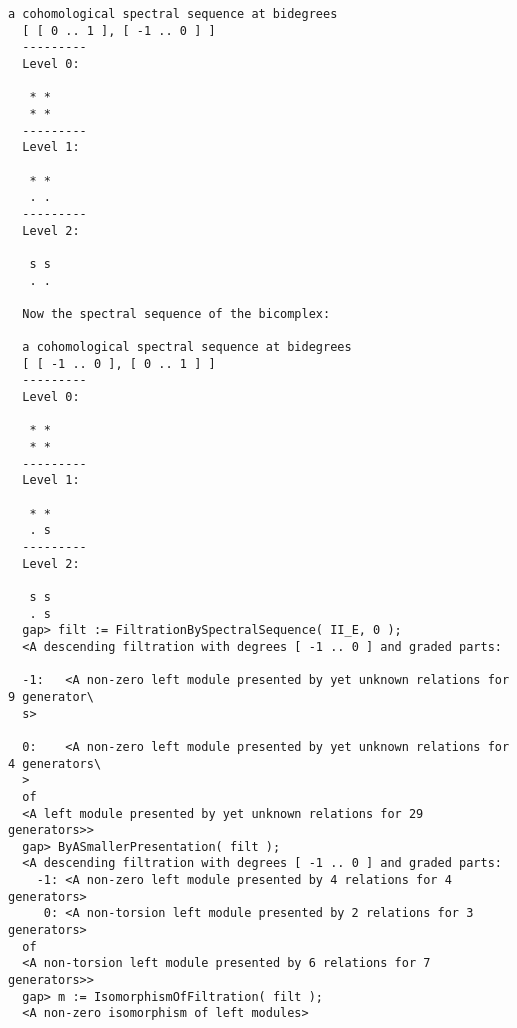 \documentclass[a4paper,11pt]{report}
\begin{document}
{{\begin{Verbatim}[fontsize=\small,frame=single,label=Example]
  a cohomological spectral sequence at bidegrees
  [ [ 0 .. 1 ], [ -1 .. 0 ] ]
  ---------
  Level 0:
  
   * *
   * *
  ---------
  Level 1:
  
   * *
   . .
  ---------
  Level 2:
  
   s s
   . .
  
  Now the spectral sequence of the bicomplex:
  
  a cohomological spectral sequence at bidegrees
  [ [ -1 .. 0 ], [ 0 .. 1 ] ]
  ---------
  Level 0:
  
   * *
   * *
  ---------
  Level 1:
  
   * *
   . s
  ---------
  Level 2:
  
   s s
   . s
  gap> filt := FiltrationBySpectralSequence( II_E, 0 );
  <A descending filtration with degrees [ -1 .. 0 ] and graded parts:
  
  -1:	<A non-zero left module presented by yet unknown relations for 9 generator\
  s>
  
  0:	<A non-zero left module presented by yet unknown relations for 4 generators\
  >
  of
  <A left module presented by yet unknown relations for 29 generators>>
  gap> ByASmallerPresentation( filt );
  <A descending filtration with degrees [ -1 .. 0 ] and graded parts:
    -1:	<A non-zero left module presented by 4 relations for 4 generators>
     0:	<A non-torsion left module presented by 2 relations for 3 generators>
  of
  <A non-torsion left module presented by 6 relations for 7 generators>>
  gap> m := IsomorphismOfFiltration( filt );
  <A non-zero isomorphism of left modules>
\end{Verbatim}
 }

 
}
\end{document}
